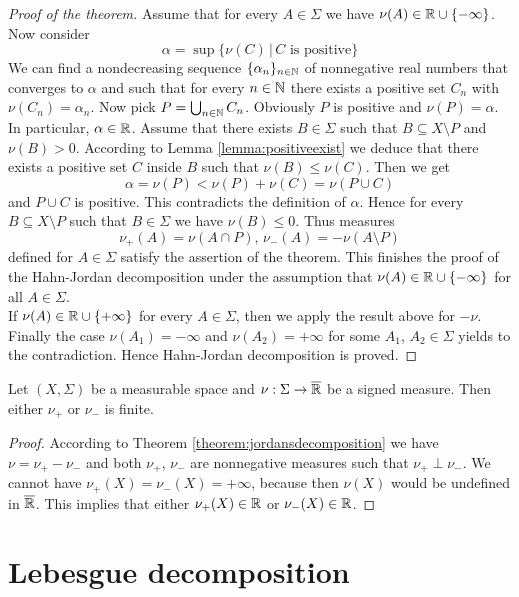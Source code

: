 \begin{proof}[Proof of the theorem]
Assume that for every $A\in \Sigma$ we have $\nu(A) \in {\mathbb R}\cup \{-\infty\}$. Now consider 
$$\alpha=\sup \big\{\nu(C)\,\big|\,C\mbox{ is positive}\big\}$$
We can find a nondecreasing sequence $\{\alpha_n\}_{n\in {\mathbb N}}$ of nonnegative real numbers that converges to $\alpha$ and such that for every $n\in {\mathbb N}$ there exists a positive set $C_n$ with $\nu(C_n)=\alpha_n$. Now pick $P=\bigcup_{n\in {\mathbb N}}C_n$. Obviously $P$ is positive and $\nu(P)=\alpha$. In particular, $\alpha \in {\mathbb R}$. Assume that there exists $B\in \Sigma$ such that $B\subseteq X\setminus P$ and $\nu(B)>0$. According to Lemma \ref{lemma:positiveexist} we deduce that there exists a positive set $C$ inside $B$ such that $\nu(B)\leq \nu(C)$. Then we get
$$\alpha=\nu(P)<\nu(P)+\nu(C)=\nu(P\cup C)$$
and $P\cup C$ is positive. This contradicts the definition of $\alpha$. Hence for every $B\subseteq X\setminus P$ such that $B\in \Sigma$ we have $\nu(B)\leq 0$. Thus measures
$$\nu_+(A) = \nu(A\cap P),\,\nu_-(A) = -\nu(A\setminus P)$$
defined for $A\in \Sigma$ satisfy the assertion of the theorem. This finishes the proof of the Hahn-Jordan decomposition under the assumption that $\nu(A)\in {\mathbb R}\cup \{-\infty\}$ for all $A\in \Sigma$.\\
If $\nu(A)\in {\mathbb R}\cup \{+\infty\}$ for every $A\in \Sigma$, then we apply the result above for $-\nu$. Finally the case $\nu(A_1)=-\infty$ and $\nu(A_2)=+\infty$ for some $A_1$, $A_2\in \Sigma$ yields to the contradiction. Hence Hahn-Jordan decomposition is proved.
\end{proof}

\begin{corollary}\label{corollary:oneisfinite}
Let $\left(X,\Sigma\right)$ be a measurable space and $\nu:\Sigma\rightarrow \overline{{\mathbb R}}$ be a signed measure. Then either $\nu_+$ or $\nu_-$ is finite.
\end{corollary}
\begin{proof}
According to Theorem \ref{theorem:jordansdecomposition} we have $\nu = \nu_+-\nu_-$ and both $\nu_+$, $\nu_-$ are nonnegative measures such that $\nu_+\perp \nu_-$. We cannot have $\nu_+(X)=\nu_-(X)=+\infty$, because then $\nu(X)$ would be undefined in $\overline{{\mathbb R}}$. This implies that either $\nu_+(X)\in {\mathbb R}$ or $\nu_-(X)\in {\mathbb R}$.
\end{proof}

\section{Lebesgue decomposition}

